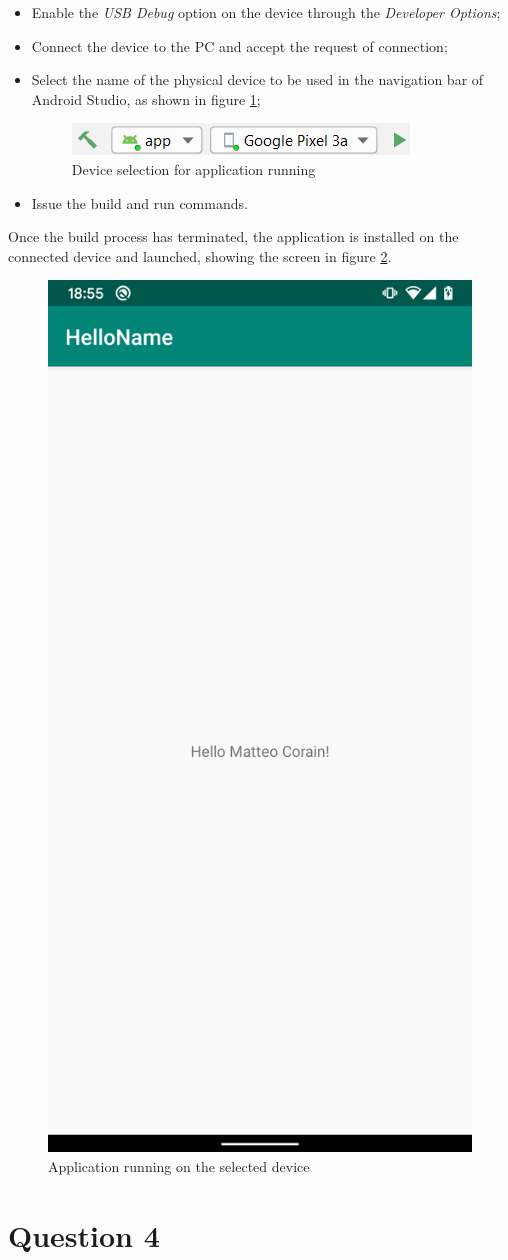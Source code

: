 \documentclass[letterpaper,headings=standardclasses]{scrartcl}
\begin{document}
\begin{itemize}

\item Enable the \emph{USB Debug} option on the device through the \emph{Developer Options};
\item Connect the device to the PC and accept the request of connection;
\item Select the name of the physical device to be used in the navigation bar of Android Studio, as shown in figure \ref{device_debug};

\begin{figure}[H]
  \centering
  \includegraphics[width=.4\linewidth]{03_device_debug.png}
  \caption{Device selection for application running}
  \label{device_debug}
\end{figure}

\item Issue the build and run commands.

\end{itemize}

Once the build process has terminated, the application is installed on the connected device and launched, showing the screen in figure \ref{device_run}.

\begin{figure}[H]
  \centering
  \includegraphics[width=.35\linewidth]{03_device_run.png}
  \caption{Application running on the selected device}
  \label{device_run}
\end{figure}

\section{Question 4}
\end{document}

